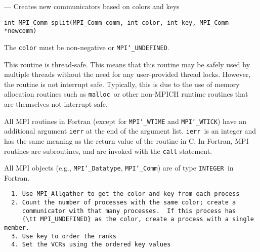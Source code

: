\startmanpage
{}
--- Creates new communicators based on colors and keys 
\startvb\begin{verbatim}
int MPI_Comm_split(MPI_Comm comm, int color, int key, MPI_Comm *newcomm)

\end{verbatim}
\endvb

\par
{}
\par
{}
The {\tt color} must be non-negative or {\tt MPI{\tt \char`\_}UNDEFINED}.
\par
{}
\par
This routine is thread-safe.  This means that this routine may be
safely used by multiple threads without the need for any user-provided
thread locks.  However, the routine is not interrupt safe.  Typically,
this is due to the use of memory allocation routines such as {\tt malloc
}or other non-MPICH runtime routines that are themselves not interrupt-safe.
\par
{}
All MPI routines in Fortran (except for {\tt MPI{\tt \char`\_}WTIME} and {\tt MPI{\tt \char`\_}WTICK}) have
an additional argument {\tt ierr} at the end of the argument list.  {\tt ierr
}is an integer and has the same meaning as the return value of the routine
in C.  In Fortran, MPI routines are subroutines, and are invoked with the
{\tt call} statement.
\par
All MPI objects (e.g., {\tt MPI{\tt \char`\_}Datatype}, {\tt MPI{\tt \char`\_}Comm}) are of type {\tt INTEGER
}in Fortran.
\par
{}
\begin{verbatim}
  1. Use MPI_Allgather to get the color and key from each process
  2. Count the number of processes with the same color; create a 
     communicator with that many processes.  If this process has
     {\tt MPI_UNDEFINED} as the color, create a process with a single member.
  3. Use key to order the ranks
  4. Set the VCRs using the ordered key values
\end{verbatim}

